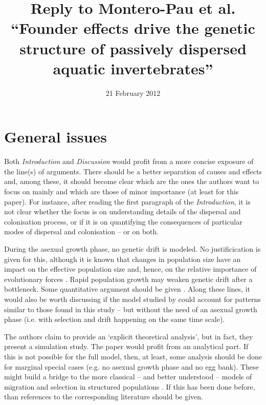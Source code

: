 \documentclass[11pt]{article}
\title{Reply to Montero-Pau et al. ``Founder effects drive the genetic structure of passively dispersed aquatic invertebrates''}
\date{21 February 2012}                                           %
\newenvironment{my_enumerate}
{\begin{enumerate}
  \setlength{\itemsep}{2pt}
  \setlength{\parskip}{0pt}
  \setlength{\parsep}{0pt}}
{\end{enumerate}}
\begin{document}
\maketitle


\section{General issues}


\begin{my_enumerate}
	\item Both \emph{Introduction} and \emph{Discussion} would profit from a more concise exposure of the line(s) of arguments. There should be a better separation of causes and effects and, among these, it should become clear which are the ones the authors want to focus on mainly and which are those of minor importance (at least for this paper). For instance, after reading the first paragraph of the \emph{Introduction}, it is not clear whether the focus is on understanding details of the dispersal and colonisation process, or if it is on quantifying the consequences of particular modes of dispersal and colonisation -- or on both.
	\item During the asexual growth phase, no genetic drift is modeled. No justificication is given for this, although it is known that changes in population size have an impact on the effective population size and, hence, on the relative importance of evolutionary forces \citep{Wright:1938uq}. Rapid population growth may weaken genetic drift after a bottleneck. Some quantitative argument should be given \cite[e.g.][]{Slatkin:1996fk}. Along these lines, it would also be worth discussing if the model studied by \citet{Slatkin:1996fk} could account for patterns similar to those found in this study -- but without the need of an asexual growth phase (i.e. with selection and drift happening on the same time scale).
	\item The authors claim to provide an `explicit theoretical analysis', but in fact, they present a simulation study. The paper would profit from an analytical part. If this is not possible for the full model, then, at least, some analysis should be done for marginal special cases (e.g. no asexual growth phase and no egg bank). These might build a bridge to the more classical -- and better understood -- models of migration and selection in structured populations \cite[e.g.][]{Slatkin:1996fk, Nagylaki:2008uq}. If this has been done before, than references to the corresponding literature should be given.

\end{my_enumerate}
\end{document}
